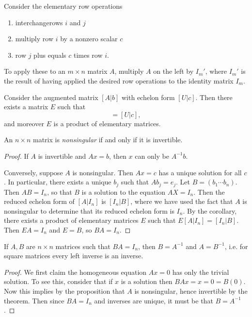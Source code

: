 \documentclass[12pt]{article}
\begin{document}
\begin{proposition}
	Consider the elementary row operations
	\begin{enumerate}
		\item interchangerows $i$ and $j$
		\item multiply row $i$ by a nonzero scalar $c$
		\item row $j$ plus equals $c$ times row $i$.
	\end{enumerate}
	To apply these to an $m\times n$ matrix $A$, multiply $A$ on the left by $I_m'$, where $I_m'$ is the result of having applied the desired row operations to the identity matrix $I_m$.
\end{proposition}

\begin{corollary}
	Consider the augmented matrix $[A|b]$ with echelon form $[U|c]$. Then there exists a matrix $E$ such that 
	\begin{equation*}
		[EA|Eb] = [U|c],
	\end{equation*}
	and moreover $E$ is a product of elementary matrices.
\end{corollary}

\begin{theorem}
	An $n\times n$ matrix is \emph{nonsingular} if and only if it is invertible.
\end{theorem}
\begin{proof} 
	If $A$ is invertible and $Ax=b$, then $x$ can only be $A^{-1}b$.

	Conversely, suppose $A$ is nonsingular. Then $Ax=c$ has a unique solution for all $c$. In particular, there exists a unique $b_j$ such that $Ab_j=e_j$. Let $B=(b_1 \cdots b_n)$. Then $AB=I_n$, so that $B$ is a solution to the equation $AX=I_n$. Then the reduced echelon form of $[A|I_n]$ is $[I_n|B]$, where we have used the fact that $A$ is nonsingular to determine that its reduced echelon form is $I_n$. By the corollary, there exists a product of elementary matrices $E$ such that $E[A|I_n]=[I_n|B]$. Then $EA=I_n$ and $E=B$, so $BA=I_n$.
\end{proof}	

\begin{corollary}
	If $A,B$ are $n\times n$ matrices such that $BA=I_n$, then $B=A^{-1}$ and $A=B^{-1}$, i.e. for square matrices every left inverse is an inverse.
\end{corollary}
\begin{proof} 
	We first claim the homogeneous equation $Ax=0$ has only the trivial solution. To see this, consider that if $x$ is a solution then $BAx=x=0=B(0)$. Now this implies by the proposition that $A$ is nonsingular, hence invertible by the theorem. Then since $BA=I_n$ and inverses are unique, it must be that $B=A^{-1}$.
\end{proof}	
\end{document}
